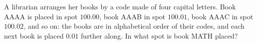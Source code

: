 A librarian arranges her books by a code made of four capital letters. Book AAAA is placed in spot $100.00$, book AAAB in spot $100.01$, book AAAC in spot $100.02$, and so on: the books are in alphabetical order of their codes, and each next book is placed $0.01$ further along. In what spot is book MATH placed?
